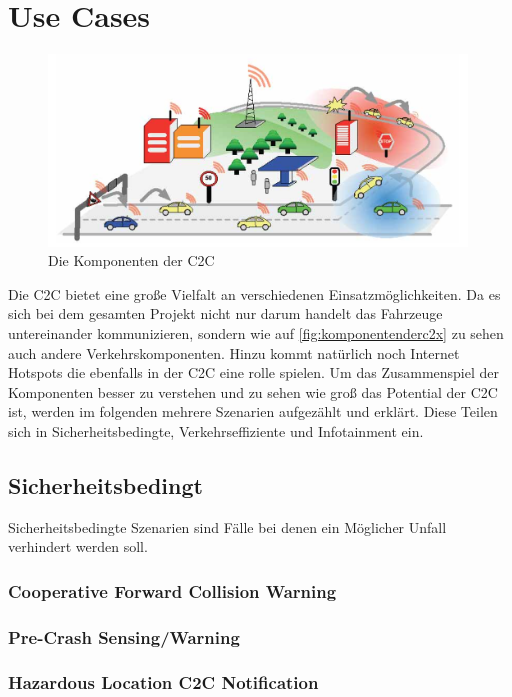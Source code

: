 \chapter{Use Cases\label{chap:usecases}}
\begin{figure}[htbp]
\includegraphics[width=0.99\textwidth]{content/images/06_use_cases/komponenten.png}
\caption{Die Komponenten der \acl{C2C}}
\label{fig:komponentenderc2x}
\end{figure}
Die \acl{C2C} bietet eine große Vielfalt an verschiedenen Einsatzmöglichkeiten. Da es sich bei dem gesamten Projekt nicht nur darum handelt das Fahrzeuge untereinander kommunizieren, sondern wie auf \autoref{fig:komponentenderc2x} zu sehen auch andere Verkehrskomponenten. Hinzu kommt natürlich noch Internet Hotspots die ebenfalls in der C2C eine rolle spielen. Um das Zusammenspiel der Komponenten besser zu verstehen und zu sehen wie groß das Potential der \acl{C2C} ist, werden im folgenden mehrere Szenarien aufgezählt und erklärt. Diese Teilen sich in Sicherheitsbedingte, Verkehrseffiziente und Infotainment ein. 

\section{Sicherheitsbedingt}
Sicherheitsbedingte Szenarien sind Fälle bei denen ein Möglicher Unfall verhindert werden soll. 
\subsection{Cooperative Forward Collision Warning}

\subsection{Pre-Crash Sensing/Warning}

\subsection{Hazardous Location C2C Notification}

